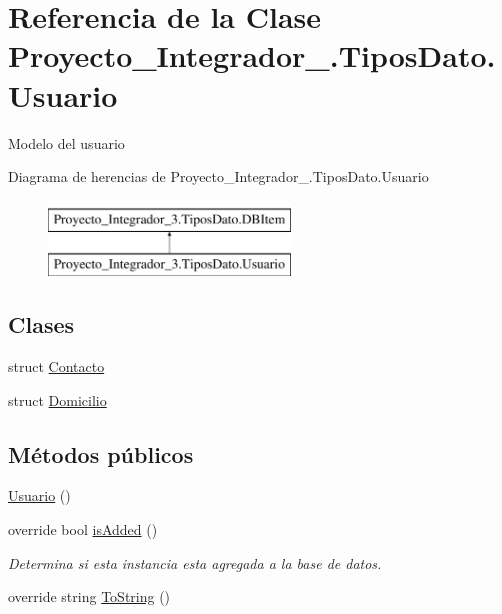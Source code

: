 \hypertarget{class_proyecto___integrador__3_1_1_tipos_dato_1_1_usuario}{\section{Referencia de la Clase Proyecto\-\_\-\-Integrador\-\_.\-Tipos\-Dato.\-Usuario}
\label{class_proyecto___integrador__3_1_1_tipos_dato_1_1_usuario}
}


Modelo del usuario  


Diagrama de herencias de Proyecto\-\_\-\-Integrador\-\_.\-Tipos\-Dato.\-Usuario\begin{figure}[H]
\begin{center}
\leavevmode
\includegraphics[height=2.000000cm]{d8/dc0/class_proyecto___integrador__3_1_1_tipos_dato_1_1_usuario}
\end{center}
\end{figure}
\subsection*{Clases}
\begin{DoxyCompactItemize}
\item 
struct \hyperlink{struct_proyecto___integrador__3_1_1_tipos_dato_1_1_usuario_1_1_contacto}{Contacto}
\item 
struct \hyperlink{struct_proyecto___integrador__3_1_1_tipos_dato_1_1_usuario_1_1_domicilio}{Domicilio}
\end{DoxyCompactItemize}
\subsection*{Métodos públicos}
\begin{DoxyCompactItemize}
\item 
\hyperlink{class_proyecto___integrador__3_1_1_tipos_dato_1_1_usuario_a4b727b3cfd600bbecd0f5a2673152110}{Usuario} ()
\item 
override bool \hyperlink{class_proyecto___integrador__3_1_1_tipos_dato_1_1_usuario_a6ebae0d39a68af27c93fd85719bb1664}{is\-Added} ()
\begin{DoxyCompactList}\small\item\em Determina si esta instancia esta agregada a la base de datos. \end{DoxyCompactList}\item 
override string \hyperlink{class_proyecto___integrador__3_1_1_tipos_dato_1_1_usuario_ad04ec01ff1bc03efc0d4defd5589ba52}{To\-String} ()
\end{DoxyCompactItemize}
